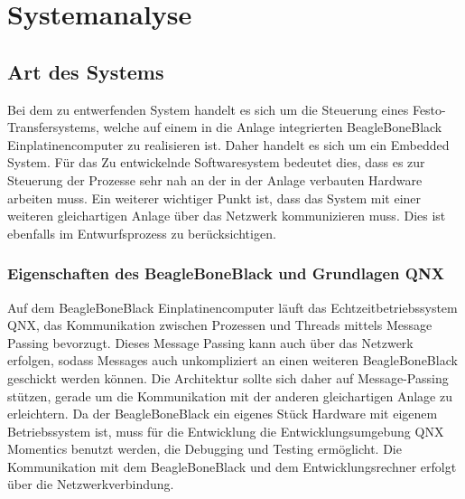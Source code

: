 











\section{Systemanalyse}\label{sec:systemanalyse}


\subsection{Art des Systems}

Bei dem zu entwerfenden System handelt es sich um die Steuerung eines Festo-Transfersystems, welche auf einem in die Anlage integrierten BeagleBoneBlack Einplatinencomputer zu realisieren ist.
Daher handelt es sich um ein Embedded System. 
Für das Zu entwickelnde Softwaresystem bedeutet dies, dass es zur Steuerung der Prozesse sehr nah an der in der Anlage verbauten Hardware arbeiten muss. 
Ein weiterer wichtiger Punkt ist, dass das System mit einer weiteren gleichartigen Anlage über das Netzwerk kommunizieren muss. Dies ist ebenfalls im Entwurfsprozess zu berücksichtigen.

\subsubsection{Eigenschaften des BeagleBoneBlack und Grundlagen QNX}

Auf dem BeagleBoneBlack Einplatinencomputer läuft das Echtzeitbetriebssystem QNX, das Kommunikation zwischen Prozessen und Threads mittels Message Passing bevorzugt.
Dieses Message Passing kann auch über das Netzwerk erfolgen, sodass Messages auch unkompliziert an einen weiteren BeagleBoneBlack geschickt werden können. 
Die Architektur sollte sich daher auf Message-Passing stützen, gerade um die Kommunikation mit der anderen gleichartigen Anlage zu erleichtern.
Da der BeagleBoneBlack ein eigenes Stück Hardware mit eigenem Betriebssystem ist, muss für die Entwicklung die Entwicklungsumgebung QNX Momentics benutzt werden, die Debugging und Testing ermöglicht.
Die Kommunikation mit dem BeagleBoneBlack und dem Entwicklungsrechner erfolgt über die Netzwerkverbindung.

